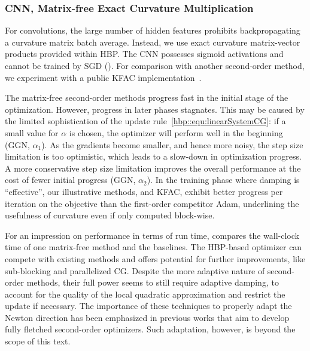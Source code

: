 \subsubsection{CNN, Matrix-free Exact Curvature Multiplication}

For convolutions, the large number of hidden features prohibits backpropagating
a curvature matrix batch average. Instead, we use exact curvature matrix-vector
products provided within HBP. The CNN possesses sigmoid activations and cannot
be trained by SGD (). For comparison with
another second-order method, we experiment with a public KFAC
implementation~\citep[see  for
details]{martens2015optimizing,grosse2016kronecker}.

The matrix-free second-order methods progress fast in the initial stage of the
optimization. However, progress in later phases stagnates. This may be caused by
the limited sophistication of the update rule~\eqref{hbp::equ:linearSystemCG}: if a
small value for $\alpha$ is chosen, the optimizer will perform well in the
beginning (GGN, $\alpha_1$). As the gradients become smaller, and hence more
noisy, the step size limitation is too optimistic, which leads to a slow-down in
optimization progress. A more conservative step size limitation improves the
overall performance at the cost of fewer initial progress (GGN, $\alpha_2$). In
the training phase where damping is ``effective'', our illustrative methods, and
KFAC, exhibit better progress per iteration on the objective than the
first-order competitor Adam, underlining the usefulness of curvature even if
only computed block-wise.

For an impression on performance in terms of run time,
 compares the wall-clock time of one
matrix-free method and the baselines. The HBP-based optimizer can compete with
existing methods and offers potential for further improvements, like
sub-blocking and parallelized CG. Despite the more adaptive nature of
second-order methods, their full power seems to still require adaptive damping,
to account for the quality of the local quadratic approximation and restrict the
update if necessary. The importance of these techniques to properly adapt the
Newton direction has been emphasized in previous works
\citep{martens2010deep,martens2015optimizing, botev2017practical} that aim to
develop fully fletched second-order optimizers. Such adaptation, however, is
beyond the scope of this text.

